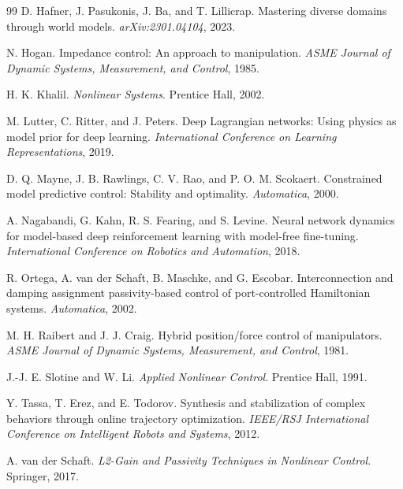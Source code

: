 \documentclass{article}
\begin{document}
\begin{thebibliography}{99}
D. Hafner, J. Pasukonis, J. Ba, and T. Lillicrap.
\newblock Mastering diverse domains through world models.
\newblock \emph{arXiv:2301.04104}, 2023.

N. Hogan.
\newblock Impedance control: An approach to manipulation.
\newblock \emph{ASME Journal of Dynamic Systems, Measurement, and Control}, 1985.

H. K. Khalil.
\newblock \emph{Nonlinear Systems}.
\newblock Prentice Hall, 2002.

M. Lutter, C. Ritter, and J. Peters.
\newblock Deep Lagrangian networks: Using physics as model prior for deep learning.
\newblock \emph{International Conference on Learning Representations}, 2019.

D. Q. Mayne, J. B. Rawlings, C. V. Rao, and P. O. M. Scokaert.
\newblock Constrained model predictive control: Stability and optimality.
\newblock \emph{Automatica}, 2000.

A. Nagabandi, G. Kahn, R. S. Fearing, and S. Levine.
\newblock Neural network dynamics for model-based deep reinforcement learning with model-free fine-tuning.
\newblock \emph{International Conference on Robotics and Automation}, 2018.

R. Ortega, A. van der Schaft, B. Maschke, and G. Escobar.
\newblock Interconnection and damping assignment passivity-based control of port-controlled Hamiltonian systems.
\newblock \emph{Automatica}, 2002.

M. H. Raibert and J. J. Craig.
\newblock Hybrid position/force control of manipulators.
\newblock \emph{ASME Journal of Dynamic Systems, Measurement, and Control}, 1981.

J.-J. E. Slotine and W. Li.
\newblock \emph{Applied Nonlinear Control}.
\newblock Prentice Hall, 1991.

Y. Tassa, T. Erez, and E. Todorov.
\newblock Synthesis and stabilization of complex behaviors through online trajectory optimization.
\newblock \emph{IEEE/RSJ International Conference on Intelligent Robots and Systems}, 2012.

A. van der Schaft.
\newblock \emph{L2-Gain and Passivity Techniques in Nonlinear Control}.
\newblock Springer, 2017.


\end{thebibliography}
\end{document}
